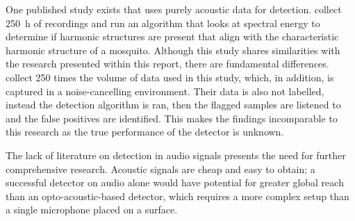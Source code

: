         One published study exists that uses purely acoustic data for detection. \textcite{D.R.Raman2007} collect \SI{250}{\hour} of recordings and run an algorithm that looks at spectral energy to determine if harmonic structures are present that align with the characteristic harmonic structure of a mosquito. Although this study shares similarities with the research presented within this report, there are fundamental differences. \textcite{D.R.Raman2007} collect 250 times the volume of data used in this study, which, in addition, is captured in a noise-cancelling environment. Their data is also not labelled, instead the detection algorithm is ran, then the flagged samples are listened to and the false positives are identified. This makes the findings incomparable to this research as the true performance of the detector is unknown.
        
        The lack of literature on detection in audio signals presents the need for further comprehensive research. Acoustic signals are cheap and easy to obtain; a successful detector on audio alone would have potential for greater global reach than an opto-acoustic-based detector, which requires a more complex setup than a single microphone placed on a surface.